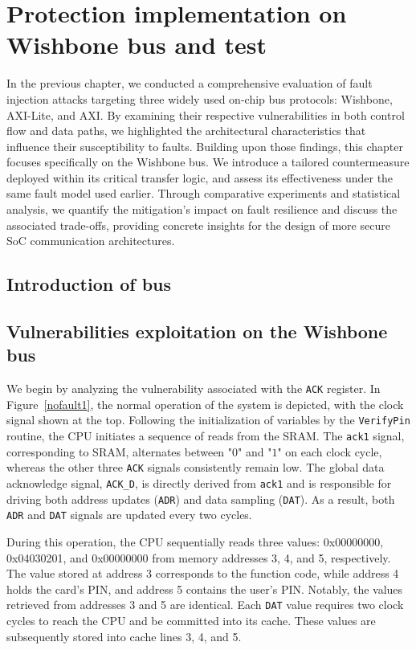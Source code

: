\chapter{Protection implementation on Wishbone bus and test}
In the previous chapter, we conducted a comprehensive evaluation of fault injection attacks targeting three widely used on-chip bus protocols: Wishbone, AXI-Lite, and AXI. By examining their respective vulnerabilities in both control flow and data paths, we highlighted the architectural characteristics that influence their susceptibility to faults. Building upon those findings, this chapter focuses specifically on the Wishbone bus. We introduce a tailored countermeasure deployed within its critical transfer logic, and assess its effectiveness under the same fault model used earlier. Through comparative experiments and statistical analysis, we quantify the mitigation's impact on fault resilience and discuss the associated trade-offs, providing concrete insights for the design of more secure SoC communication architectures.
\section{Introduction of bus}

\section{Vulnerabilities exploitation on the Wishbone bus} 

We begin by analyzing the vulnerability associated with the \texttt{ACK} register. In Figure~\ref{nofault1}, the normal operation of the system is depicted, with the clock signal shown at the top. Following the initialization of variables by the \texttt{VerifyPin} routine, the CPU initiates a sequence of reads from the SRAM. The \texttt{ack1} signal, corresponding to SRAM, alternates between "$0$" and "$1$" on each clock cycle, whereas the other three \texttt{ACK} signals consistently remain low. The global data acknowledge signal, \texttt{ACK\_D}, is directly derived from \texttt{ack1} and is responsible for driving both address updates (\texttt{ADR}) and data sampling (\texttt{DAT}). As a result, both \texttt{ADR} and \texttt{DAT} signals are updated every two cycles.

During this operation, the CPU sequentially reads three values: 0x00000000, 0x04030201, and 0x00000000 from memory addresses 3, 4, and 5, respectively. The value stored at address 3 corresponds to the function code, while address 4 holds the card's PIN, and address 5 contains the user's PIN. Notably, the values retrieved from addresses 3 and 5 are identical. Each \texttt{DAT} value requires two clock cycles to reach the CPU and be committed into its cache. These values are subsequently stored into cache lines 3, 4, and 5.

